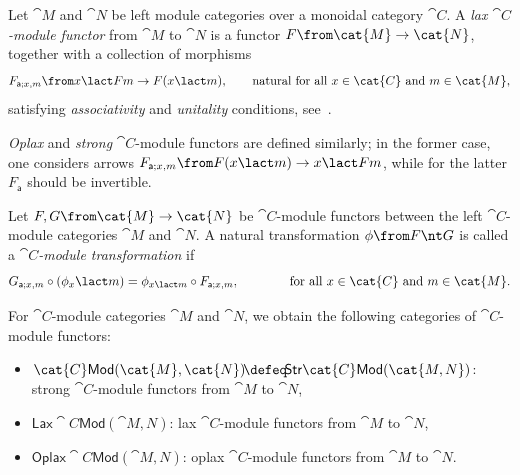 \begin{definition}\label{def:lax-module-functor}
  Let \(\cat{M}\) and \(\cat{N}\) be left module categories over a monoidal category \(\cat{C}\).
  A \emph{lax \(\cat{C}\)\hyp{}module functor} from \(\cat{M}\) to \(\cat{N}\) is a functor
  \(F \from \cat{M} \to \cat{N}\), together with a collection of morphisms
  \[
    F_{\mathsf{a};x,m} \from x \lact Fm \to F(x \lact m), \qquad \text{natural for all \(x \in \cat{C}\) and \(m \in \cat{M}\)},
  \]
  satisfying \emph{associativity} and \emph{unitality} conditions, see~\cite[Definition~7.2.1]{Etingof2015}.

  \emph{Oplax} and \emph{strong} \(\cat{C}\)\hyp{}module functors are defined similarly;
  in the former case,
  one considers arrows \(F_{\mathsf{a}; x, m} \from F(x \lact m) \to x \lact Fm\),
  while for the latter \(F_{\mathsf{a}}\) should be invertible.
\end{definition}

\begin{definition}\label{def:module-transformation}
  Let \(F, G \from \cat{M} \to \cat{N}\) be \(\cat{C}\)\hyp{}module functors between the left \(\cat{C}\)\hyp{}module categories \(\cat{M}\) and \(\cat{N}\).
  A natural transformation \(\phi \from F \nt G\) is called a
  \emph{\(\cat{C}\)\hyp{}module transformation}
  if
  \[
    G_{\mathsf{a};x, m} \circ (\phi_x \lact m) = \phi_{x \lact m} \circ F_{\mathsf{a};x, m}, \qquad\qquad
    \text{for all \(x \in \cat{C}\) and \(m \in \cat{M}\).}
  \]
\end{definition}

\begin{notation}
  For \(\cat{C}\)\hyp{}module categories \(\cat{M}\) and \(\cat{N}\),
  we obtain the following categories of \(\cat{C}\)\hyp{}module functors:
  \begin{itemize}
    \item \(\cat{C}\mathsf{Mod}(\cat{M},\cat{N}) \!\defeq\! \mathsf{Str}\cat{C}\mathsf{Mod}(\cat{M,N})\):
    strong \(\cat{C}\)\hyp{}module functors from \(\cat{M}\) to \(\cat{N}\),
    \item \(\mathsf{Lax}\cat{C}\mathsf{Mod}(\cat{M,N})\):
    lax \(\cat{C}\)\hyp{}module functors from \(\cat{M}\) to \(\cat{N}\),
    \item \(\mathsf{Oplax}\cat{C}\mathsf{Mod}(\cat{M,N})\):
    oplax \(\cat{C}\)\hyp{}module functors from \(\cat{M}\) to \(\cat{N}\).
  \end{itemize}
\end{notation}

